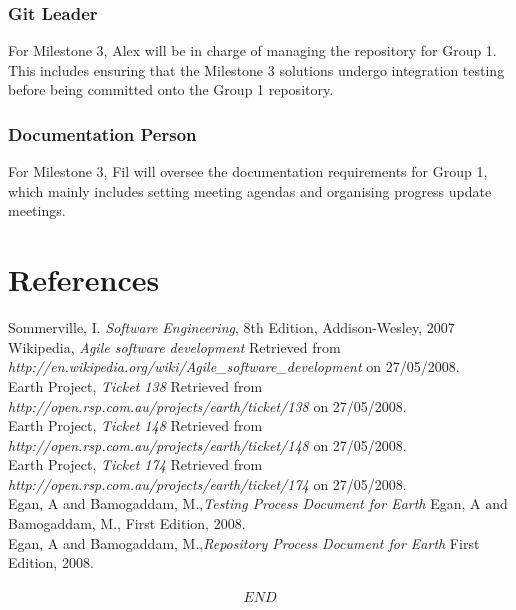 \documentclass[10pt,a4,oneside]{article}
\begin{document}
\subsubsection{Git Leader}

For Milestone 3, Alex will be in charge of managing the repository for Group 1. This includes ensuring that the Milestone 3 solutions undergo integration testing before being committed onto the Group 1 repository.


\subsubsection{Documentation Person}

For Milestone 3, Fil will oversee the documentation requirements for Group 1, which mainly includes setting meeting agendas and organising progress update meetings.

\newpage

\section{References}
 
Sommerville, I. \textit{Software Engineering}, 8th Edition,  Addison-Wesley, 2007\\
\newline
Wikipedia, \textit{Agile software development} Retrieved from \emph{http://en.wikipedia.org/wiki/Agile\_software\_development} on 27/05/2008.\\
\newline
Earth Project, \textit{Ticket 138} Retrieved from \emph{http://open.rsp.com.au/projects/earth/ticket/138} on 27/05/2008.\\
\newline
Earth Project, \textit{Ticket 148} Retrieved from \emph{http://open.rsp.com.au/projects/earth/ticket/148} on 27/05/2008.\\
\newline
Earth Project, \textit{Ticket 174} Retrieved from \emph{http://open.rsp.com.au/projects/earth/ticket/174} on 27/05/2008.\\
\newline
Egan, A and Bamogaddam, M.,\textit{Testing Process Document for Earth} Egan, A and Bamogaddam, M., First Edition, 2008.\\
\newline
Egan, A and Bamogaddam, M.,\textit{Repository Process Document for Earth}  First Edition, 2008.\\

\paragraph{}

\[ END\]
\end{document}
